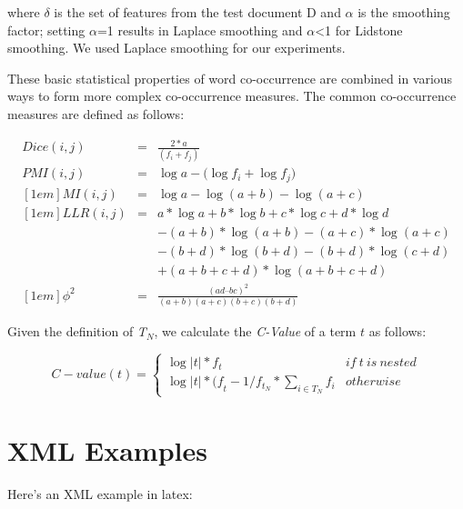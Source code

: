 \documentclass[11pt]{article}
\begin{document}
\noindent where $\delta$ is the set of features from the test document D and $\alpha$ is the smoothing factor; setting $\alpha$=1 results in Laplace smoothing and $\alpha$\textless1 for Lidstone smoothing. We used Laplace smoothing for our experiments. 


These basic statistical properties of word co-occurrence are combined in various ways to form more complex co-occurrence measures. The common co-occurrence measures are defined as follows:

\begin{eqnarray} 
Dice(i,j) & = & \frac { 2*a }{ ({ f }_{ i }+{ f }_{ j }) }  \\[1em]
PMI(i,j) & = & \log { a } -(\log { { f }_{ i } } +\log { { f }_{ j }) }  \\ [1em]
MI(i,j) & = & \log { a } -\log { (a+b) } -\log { (a+c) }  \\ [1em]
LLR(i,j) & = & a*\log { a } +b*\log { b } +c*\log { c } +d*\log { d }  \nonumber\\  
&  & -(a+b)*\log { (a+b) } -(a+c)*\log { (a+c) }  \nonumber\\  
&  & -(b+d)*\log { (b+d) } -(b+d)*\log { (c+d) }  \nonumber\\  
&  & +(a+b+c+d)*\log { (a+b+c+d) }  \\ [1em]
{ \phi  }^{ 2 } & = & \frac { (ad–bc)^{ 2 } }{ (a+b)(a+c)(b+c)(b+d) }  
\end{eqnarray} 

Given the definition of \emph{T$_N$}, we calculate the \emph{C-Value} of a term $t$ as follows:

\begin{equation}
C-value(t)=
	\left \{
		\begin{matrix} 
		\log { |t| } *{ f }_{ t }  & if \ t \ is \ nested\\
		\log { |t| } *{ (f }_{ t }-{ 1 }/{ { f }_{ { t }_{ N } } }*
			\sum _{ i\in { T }_{ N } }^{  }{ { f }_{ i } }  & otherwise
		\end{matrix} 
	\right .
\end{equation}

\newpage
\section{XML Examples}

Here's an XML example in latex:
\end{document}
